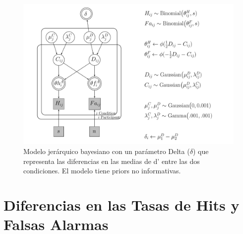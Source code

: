 \begin{figure}[th]
\centering
\includegraphics[width=1.1\textwidth]{Figures/Model_Delta_Diff_D}
\caption[Modelo Delta: Un modelo jerárquico bayesiano para revisar las diferencias en d']{Modelo jerárquico bayesiano con un parámetro Delta ($\delta$) que representa las diferencias en las medias de d' entre las dos condiciones. El modelo tiene priors no informativas.}
\label{fig:Mod_Delta}
\end{figure}









\section{Diferencias en las Tasas de Hits y Falsas Alarmas}

